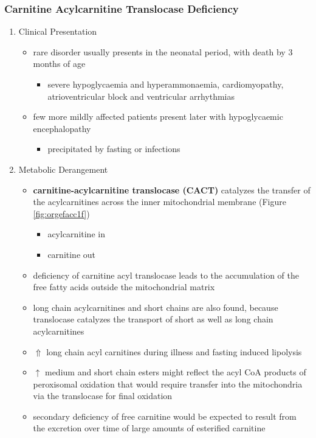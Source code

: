 \documentclass[12pt]{scrartcl}
\begin{document}
\subsubsection{Carnitine Acylcarnitine Translocase Deficiency}
\label{sec:org0b3ce70}
\begin{enumerate}
\item Clinical Presentation
\label{sec:org8164065}
\begin{itemize}
\item rare disorder usually presents in the neonatal period, with
death by 3 months of age
\begin{itemize}
\item severe hypoglycaemia and hyperammonaemia, cardiomyopathy,
atrioventricular block and ventricular arrhythmias
\end{itemize}
\item few more mildly affected patients present later with hypoglycaemic
encephalopathy
\begin{itemize}
\item precipitated by fasting or infections
\end{itemize}
\end{itemize}
\item Metabolic Derangement
\label{sec:org5b3228d}
\begin{itemize}
\item \textbf{carnitine-acylcarnitine translocase (CACT)} catalyzes the transfer
of the acylcarnitines across the inner mitochondrial membrane
(Figure \ref{fig:orgefacc1f})
\begin{itemize}
\item acylcarnitine in
\item carnitine out
\end{itemize}
\item deficiency of carnitine acyl translocase leads to the accumulation
of the free fatty acids outside the mitochondrial matrix
\item long chain acylcarnitines and short chains are also found, because
translocase catalyzes the transport of short as well as long chain
acylcarnitines
\item \(\Uparrow\) long chain acyl carnitines during illness and fasting
induced lipolysis
\item \(\uparrow\) medium and short chain esters might reflect the acyl CoA products
of peroxisomal oxidation that would require transfer into the
mitochondria via the translocase for final oxidation
\item secondary deficiency of free carnitine would be expected to result
from the excretion over time of large amounts of esterified
carnitine
\end{itemize}


\end{enumerate}
\end{document}
